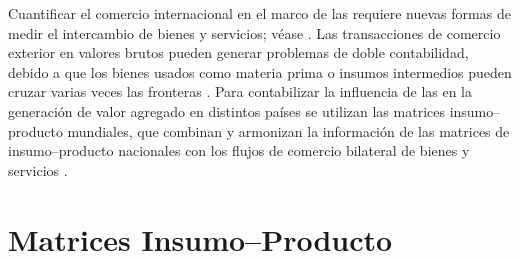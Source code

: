 
Cuantificar el comercio internacional en el marco de las  requiere nuevas formas de medir el intercambio de bienes y servicios; véase \textcite{Jones2014, Timmer2015}. Las transacciones de comercio exterior en valores brutos pueden generar problemas de doble contabilidad, debido a que los bienes usados como materia prima o insumos intermedios pueden cruzar varias veces las fronteras \parencite[p.~6]{Dalle2013}. Para contabilizar la influencia de las  en la generación de valor agregado en distintos países se utilizan las matrices insumo--producto mundiales, que combinan y armonizan la información de las matrices de insumo--producto nacionales con los flujos de comercio bilateral de bienes y servicios \parencite{BancoMexico2016, Degain2016}.%


\section{Matrices Insumo--Producto}


